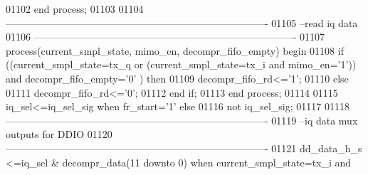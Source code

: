 \begin{DoxyCode}
01102 \textcolor{keywordflow}{end} \textcolor{keywordflow}{process};
01103 
01104 \textcolor{keyword}{-------------------------------------------------------------------------------}
01105 \textcolor{keyword}{--read iq data}
01106 \textcolor{keyword}{-------------------------------------------------------------------------------        }
01107 \textcolor{keywordflow}{process}(current_smpl_state, mimo_en, decompr_fifo_empty) \textcolor{keywordflow}{begin}
01108     \textcolor{keywordflow}{if} \textcolor{vhdlchar}{(}\textcolor{vhdlchar}{(}\textcolor{vhdlchar}{current_smpl_state}\textcolor{vhdlchar}{=}\textcolor{vhdlchar}{tx\_q} \textcolor{keywordflow}{or} \textcolor{vhdlchar}{(}\textcolor{vhdlchar}{current_smpl_state}\textcolor{vhdlchar}{=}\textcolor{vhdlchar}{tx\_i} \textcolor{keywordflow}{and} \textcolor{vhdlchar}{mimo_en}\textcolor{vhdlchar}{=}\textcolor{vhdlchar}{'}\textcolor{vhdllogic}{}\textcolor{vhdllogic}{1}\textcolor{vhdlchar}{'}\textcolor{vhdlchar}{)}\textcolor{vhdlchar}{)} \textcolor{keywordflow}{and} \textcolor{vhdlchar}{
      decompr_fifo_empty}\textcolor{vhdlchar}{=}\textcolor{vhdlchar}{'}\textcolor{vhdllogic}{}\textcolor{vhdllogic}{0}\textcolor{vhdlchar}{'} \textcolor{vhdlchar}{)} \textcolor{keywordflow}{then}
01109             \textcolor{vhdlchar}{decompr_fifo_rd}\textcolor{vhdlchar}{<=}\textcolor{vhdlchar}{'}\textcolor{vhdllogic}{}\textcolor{vhdllogic}{1}\textcolor{vhdlchar}{'}; 
01110     \textcolor{keywordflow}{else}
01111           \textcolor{vhdlchar}{decompr_fifo_rd}\textcolor{vhdlchar}{<=}\textcolor{vhdlchar}{'}\textcolor{vhdllogic}{}\textcolor{vhdllogic}{0}\textcolor{vhdlchar}{'};
01112     \textcolor{keywordflow}{end} \textcolor{keywordflow}{if}; 
01113 \textcolor{keywordflow}{end} \textcolor{keywordflow}{process};
01114 
01115 \textcolor{vhdlchar}{iq_sel}\textcolor{vhdlchar}{<=}\textcolor{vhdlchar}{iq_sel_sig} \textcolor{keywordflow}{when} \textcolor{vhdlchar}{fr_start}\textcolor{vhdlchar}{=}\textcolor{vhdlchar}{'}\textcolor{vhdllogic}{}\textcolor{vhdllogic}{1}\textcolor{vhdlchar}{'} \textcolor{keywordflow}{else} 
01116         \textcolor{keywordflow}{not} \textcolor{vhdlchar}{iq_sel_sig}; 
01117 
01118 \textcolor{keyword}{-------------------------------------------------------------------------------}
01119 \textcolor{keyword}{--iq data mux outputs for DDIO}
01120 \textcolor{keyword}{-------------------------------------------------------------------------------}
01121 \textcolor{vhdlchar}{dd_data_h_s} \textcolor{vhdlchar}{<=}\textcolor{vhdlchar}{iq_sel} \textcolor{vhdlchar}{&} \textcolor{vhdlchar}{decompr_data}\textcolor{vhdlchar}{(}\textcolor{vhdllogic}{}\textcolor{vhdllogic}{11} \textcolor{keywordflow}{downto} \textcolor{vhdllogic}{}\textcolor{vhdllogic}{0}\textcolor{vhdlchar}{)} \textcolor{keywordflow}{when} \textcolor{vhdlchar}{current_smpl_state}\textcolor{vhdlchar}{=}\textcolor{vhdlchar}{tx\_i} \textcolor{keywordflow}{and} \textcolor{vhdlchar}{
}
\end{DoxyCode}
